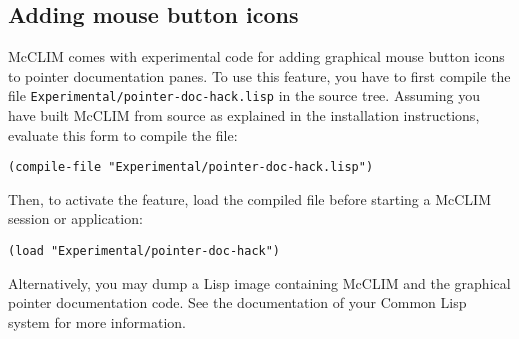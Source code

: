 \subsection{Adding mouse button icons}

McCLIM comes with experimental code for adding graphical mouse button
icons to pointer documentation panes.  To use this feature, you have to
first compile the file \texttt{Experimental/pointer-doc-hack.lisp} in the
source tree.  Assuming you have built McCLIM from source as explained in
the installation instructions, evaluate this form to compile the file:
\begin{verbatim}
(compile-file "Experimental/pointer-doc-hack.lisp")
\end{verbatim}
Then, to activate the feature, load the compiled file before starting a
McCLIM session or application:
\begin{verbatim}
(load "Experimental/pointer-doc-hack")
\end{verbatim}
Alternatively, you may dump a Lisp image containing McCLIM and the
graphical pointer documentation code.  See the documentation of your
Common Lisp system for more information.
